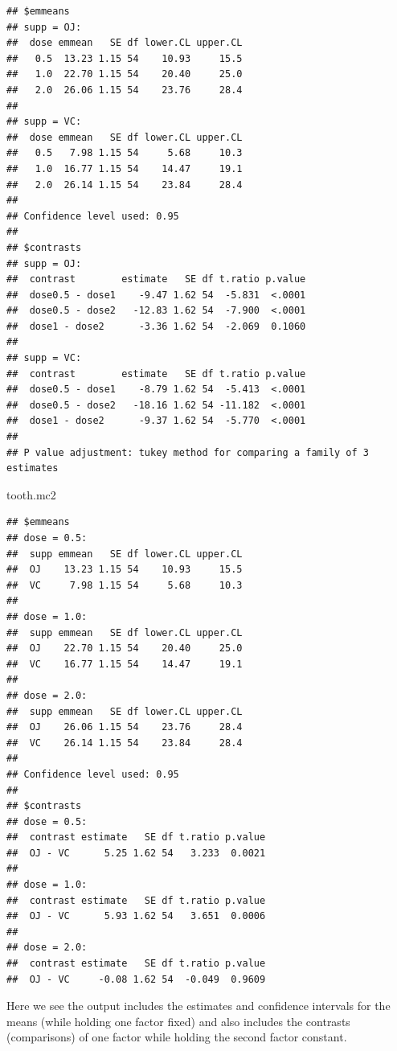 \documentclass[
]{book}
\newenvironment{Shaded}{\begin{snugshade}}{\end{snugshade}}
\newcommand{\NormalTok}[1]{#1}
\begin{document}
\begin{verbatim}
## $emmeans
## supp = OJ:
##  dose emmean   SE df lower.CL upper.CL
##   0.5  13.23 1.15 54    10.93     15.5
##   1.0  22.70 1.15 54    20.40     25.0
##   2.0  26.06 1.15 54    23.76     28.4
## 
## supp = VC:
##  dose emmean   SE df lower.CL upper.CL
##   0.5   7.98 1.15 54     5.68     10.3
##   1.0  16.77 1.15 54    14.47     19.1
##   2.0  26.14 1.15 54    23.84     28.4
## 
## Confidence level used: 0.95 
## 
## $contrasts
## supp = OJ:
##  contrast        estimate   SE df t.ratio p.value
##  dose0.5 - dose1    -9.47 1.62 54  -5.831  <.0001
##  dose0.5 - dose2   -12.83 1.62 54  -7.900  <.0001
##  dose1 - dose2      -3.36 1.62 54  -2.069  0.1060
## 
## supp = VC:
##  contrast        estimate   SE df t.ratio p.value
##  dose0.5 - dose1    -8.79 1.62 54  -5.413  <.0001
##  dose0.5 - dose2   -18.16 1.62 54 -11.182  <.0001
##  dose1 - dose2      -9.37 1.62 54  -5.770  <.0001
## 
## P value adjustment: tukey method for comparing a family of 3 estimates
\end{verbatim}

\begin{Shaded}
\begin{Highlighting}[]
\NormalTok{tooth.mc2}
\end{Highlighting}
\end{Shaded}

\begin{verbatim}
## $emmeans
## dose = 0.5:
##  supp emmean   SE df lower.CL upper.CL
##  OJ    13.23 1.15 54    10.93     15.5
##  VC     7.98 1.15 54     5.68     10.3
## 
## dose = 1.0:
##  supp emmean   SE df lower.CL upper.CL
##  OJ    22.70 1.15 54    20.40     25.0
##  VC    16.77 1.15 54    14.47     19.1
## 
## dose = 2.0:
##  supp emmean   SE df lower.CL upper.CL
##  OJ    26.06 1.15 54    23.76     28.4
##  VC    26.14 1.15 54    23.84     28.4
## 
## Confidence level used: 0.95 
## 
## $contrasts
## dose = 0.5:
##  contrast estimate   SE df t.ratio p.value
##  OJ - VC      5.25 1.62 54   3.233  0.0021
## 
## dose = 1.0:
##  contrast estimate   SE df t.ratio p.value
##  OJ - VC      5.93 1.62 54   3.651  0.0006
## 
## dose = 2.0:
##  contrast estimate   SE df t.ratio p.value
##  OJ - VC     -0.08 1.62 54  -0.049  0.9609
\end{verbatim}

Here we see the output includes the estimates and confidence intervals for the means (while holding one factor fixed) and also includes the contrasts (comparisons) of one factor while holding the second factor constant.
\end{document}
